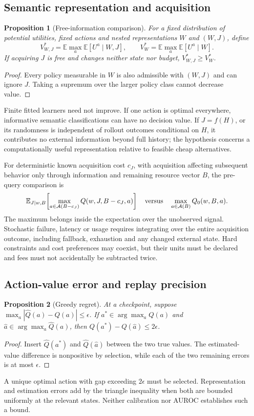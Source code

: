 \documentclass[11pt]{article}
\newtheorem{proposition}{Proposition}
\begin{document}
\subsection{Semantic representation and acquisition}
\begin{proposition}[Free-information comparison]
For a fixed distribution of potential utilities, fixed actions and nested representations $W$ and $(W,J)$, define
\[
V^*_{W,J}=\mathbb E\max_a\mathbb E[U^a\mid W,J],\qquad
V^*_W=\mathbb E\max_a\mathbb E[U^a\mid W].
\]
If acquiring $J$ is free and changes neither state nor budget, $V^*_{W,J}\geq V^*_W$.
\end{proposition}
\begin{proof}
Every policy measurable in $W$ is also admissible with $(W,J)$ and can ignore $J$. Taking a supremum over the larger policy class cannot decrease value.
\end{proof}
Finite fitted learners need not improve. If one action is optimal everywhere, informative semantic classifications can have no decision value. If $J=f(H)$, or its randomness is independent of rollout outcomes conditional on $H$, it contributes no external information beyond full history; the hypothesis concerns a computationally useful representation relative to feasible cheap alternatives.

For deterministic known acquisition cost $c_J$, with acquisition affecting subsequent behavior only through information and remaining resource vector $B$, the pre-query comparison is
\[
\mathbb E_{J\mid w,B}\!\left[\max_{a\in\mathcal A(B-c_J)}Q(w,J,B-c_J,a)\right]
\quad\hbox{versus}\quad
\max_{a\in\mathcal A(B)}Q_0(w,B,a).
\]
The maximum belongs inside the expectation over the unobserved signal. Stochastic failure, latency or usage requires integrating over the entire acquisition outcome, including fallback, exhaustion and any changed external state. Hard constraints and cost preferences may coexist, but their units must be declared and fees must not accidentally be subtracted twice.

\subsection{Action-value error and replay precision}
\begin{proposition}[Greedy regret]
At a checkpoint, suppose $\max_a|\widehat Q(a)-Q(a)|\leq\epsilon$. If $a^*\in\arg\max_a Q(a)$ and $\widehat a\in\arg\max_a\widehat Q(a)$, then $Q(a^*)-Q(\widehat a)\leq2\epsilon$.
\end{proposition}
\begin{proof}
Insert $\widehat Q(a^*)$ and $\widehat Q(\widehat a)$ between the two true values. The estimated-value difference is nonpositive by selection, while each of the two remaining errors is at most $\epsilon$.
\end{proof}
A unique optimal action with gap exceeding $2\epsilon$ must be selected. Representation and estimation errors add by the triangle inequality when both are bounded uniformly at the relevant states. Neither calibration nor AUROC establishes such a bound.
\end{document}
